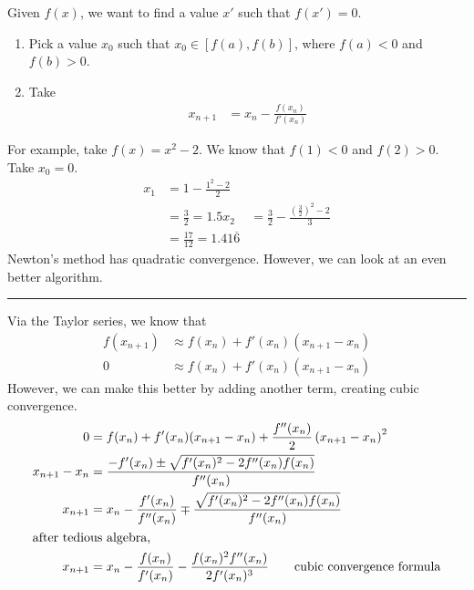 \documentclass[8pt]{extarticle}
\title{}
\author{Avinash Iyer}
\date{}
\begin{document}
  Given $f(x)$, we want to find a value $x'$ such that $f(x') = 0$.
  \begin{enumerate}[(1)]
    \item Pick a value $x_0$ such that $x_0\in[f(a),f(b)]$, where $f(a) < 0$ and $f(b) > 0$.
    \item Take
      \begin{align*}
        x_{n+1} &= x_n - \frac{f(x_n)}{f'(x_n)}
      \end{align*}
  \end{enumerate}
  For example, take $f(x) = x^2 - 2$. We know that $f(1) < 0$ and $f(2) > 0$. Take $x_0 = 0$.
  \begin{align*}
    x_1 &= 1 - \frac{1^2 - 2}{2}\\
        &= \frac{3}{2} = 1.5
    x_2 &= \frac{3}{2} - \frac{\left(\frac{3}{2}\right)^2 - 2}{3}\\
        &= \frac{17}{12} = 1.41\overline{6}
  \end{align*}
  Newton's method has quadratic convergence. However, we can look at an even better algorithm.\\
  \vspace{4pt}
  \rule{\textwidth}{0.4pt}
  \vspace{4pt}
  Via the Taylor series, we know that
  \begin{align*}
    f(x_{n+1}) &\approx f(x_n) + f'(x_n)(x_{n+1} - x_n)\\
    0 &\approx f(x_n) + f'(x_n)(x_{n+1} - x_n)
  \end{align*}
  However, we can make this better by adding another term, creating cubic convergence.
  \begin{align*}
    0 &= f(x_n) + f'(x_n)(x_{n+1}-x_n) + \frac{f''(x_n)}{2}\left(x_{n+1}-x_n\right)^2\\
    x_{n+1}-x_n &= \frac{-f'(x_n) \pm \sqrt{f'(x_n)^2 - 2f''(x_n)f(x_n)}}{f''(x_n)}\\
    x_{n+1} &= x_n -\frac{f'(x_n)}{f''(x_n)} \mp \frac{\sqrt{f'(x_n)^2 - 2f''(x_n)f(x_n)}}{f''(x_n)}\\
    \shortintertext{after tedious algebra,}
    x_{n+1} &= x_n - \frac{f(x_n)}{f'(x_n)}-\frac{f(x_n)^2f''(x_n)}{2f'(x_n)^3} \tag*{cubic convergence formula}
  \end{align*}
\end{document}
